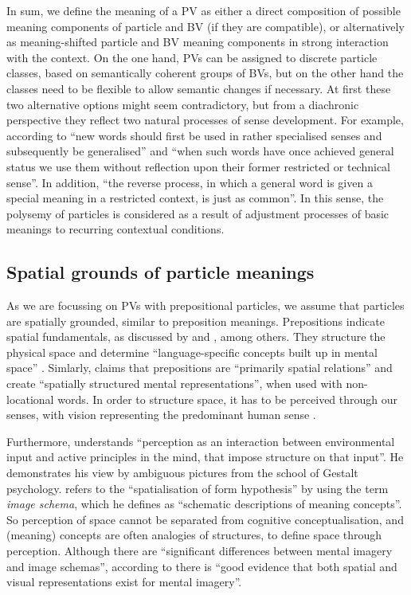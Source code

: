 \documentclass[output=paper]{langsci/langscibook}
\begin{document}
In sum, we define the meaning of a PV as either a direct composition
of possible meaning components of particle and BV (if they are
compatible), or alternatively as meaning-shifted particle and BV
meaning components in strong interaction with the context. On the one
hand, PVs can be assigned to discrete particle classes, based on
semantically coherent groups of BVs, but on the other hand the classes
need to be flexible to allow semantic changes if necessary. At first
these two alternative options might seem contradictory, but from a
diachronic perspective they reflect two natural processes of sense
development. For example, according to \cite{Waldron:79} ``new words
should first be used in rather specialised senses and subsequently be
generalised'' and ``when such words have once achieved general status
we use them without reflection upon their former restricted or
technical sense''. In addition, ``the reverse process, in which a
general word is given a special meaning in a restricted context, is
just as common''. In this sense, the polysemy of particles is
considered as a result of adjustment processes of basic meanings to
recurring contextual conditions.

\subsection{Spatial grounds of particle meanings}

As we are focussing on PVs with prepositional particles, we assume
that particles are spatially grounded, similar to preposition
meanings. Prepositions indicate spatial fundamentals, as discussed by
\cite{Herskovits:86} and \cite{Dirven:93}, among others. They
structure the physical space and determine ``language-specific
concepts built up in mental space'' \citep{Dirven:93}. Simlarly, \cite{Gaerdenfors:04}
claims that prepositions are ``primarily spatial relations'' and
create ``spatially structured mental representations'', when used with
non-locational words. In order to structure space, it has to be
perceived through our senses, with vision representing the predominant
human sense \citep{Viberg:83}.

Furthermore, \cite{Jackendoff:83} understands ``perception as an
interaction between environmental input and active principles in the
mind, that impose structure on that input''. He demonstrates his view
by ambiguous pictures from the school of Gestalt psychology.
\cite{Lakoff:87} refers to the ``spatialisation of form hypothesis''
by using the term \textit{image schema}, which he defines as
``schematic descriptions of meaning concepts''. So perception of space
cannot be separated from cognitive conceptualisation, and (meaning)
concepts are often analogies of structures, to define space through
perception. Although there are ``significant differences between
mental imagery and image schemas'', according to
\cite{Gibbs/Colston:95} there is ``good evidence that both spatial and
visual representations exist for mental imagery''.
\end{document}
